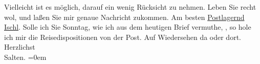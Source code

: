 \begin{ledgroupsized}[t]{13cm}
           Vielleicht ist es möglich, darauf ein wenig Rücksicht zu nehmen.\pend
           \pstart
           {\pb}Leben Sie recht wol, und
               laßen Sie mir genaue Nachricht zukommen. Am besten \uline{Postlagernd Ischl}.\pend
           \pstart
           Solle ich Sie Sonntag, wie ich aus dem heutigen Brief
               vermuthe, \label{K_L03308-4v}\label{K_L03308-4h}, so hole ich mir die
               Reisedispositionen von der Post.\pend
           \pstart
           Auf Wiedersehen da oder dort. {\\[\baselineskip]}Herzlichst {\\[\baselineskip]}\spacefill\mbox{Salten.}\pend
           \leftskip=0em{}
         
         \endnumbering{}\end{ledgroupsized}  \newcommand{\dateiname}{L03308}\newcommand{\titel}{Felix Salten an Arthur Schnitzler, 7. 8. 1900}\newcommand{\editorInnen}{Martin Anton Müller und Laura Untner}
      